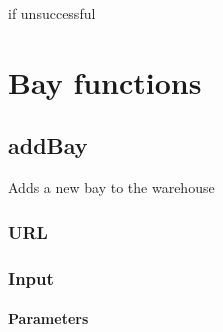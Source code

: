 \documentclass[letterpaper,10pt,english]{sphinxmanual}
\let\oldsubsection\subsection
\renewcommand{\subsection}{\needspace{6\baselineskip}\oldsubsection}
\begin{document}
 if unsuccessful


\section{Bay functions}
\label{\detokenize{docs/Developer/index:bay-functions}}

\subsection{addBay}
\label{\detokenize{docs/Developer/addBay:addbay}}\label{\detokenize{docs/Developer/addBay::doc}}
Adds a new bay to the warehouse


\subsubsection{URL}
\label{\detokenize{docs/Developer/addBay:url}}


\subsubsection{Input}
\label{\detokenize{docs/Developer/addBay:input}}
\begin{sphinxVerbatim}[commandchars=\\\{\}]
   
   
   
   
   
   
\end{sphinxVerbatim}


\paragraph{Parameters}
\label{\detokenize{docs/Developer/addBay:parameters}}
\end{document}
